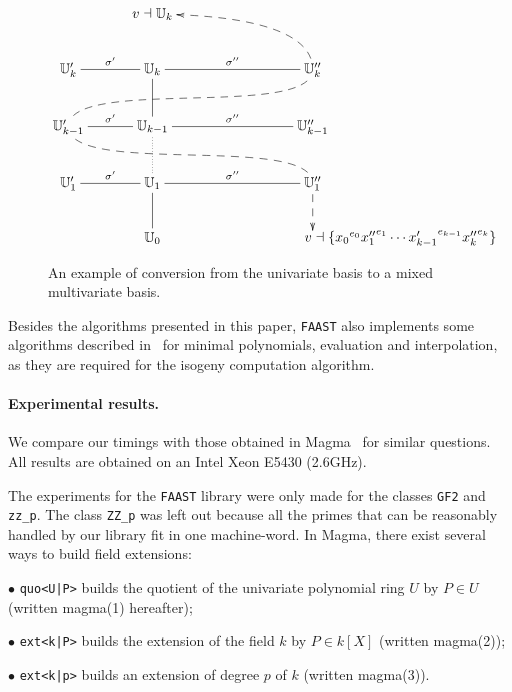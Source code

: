\begin{figure}
  \centering
  \begin{equation*}
    \xymatrix@C=1cm{
      & v\wrt\U_k \ar@{<--}@(r,u)[dr] \\
      \U_k'\ar@{-}[r]^{\sigma'} & \U_k\ar@{-}[d] & \U_k''\ar@{-}[l]_{\sigma''} \ar@{--}@(d,u)[dll]\\
      \U_{k-1}'\ar@{-}[r]^{\sigma'} \ar@{--}@(d,u)[drr] & \U_{k-1}\ar@{.}[d] & \U_{k-1}''\ar@{-}[l]_{\sigma''}\\
      \U_1'\ar@{-}[r]^{\sigma'} & \U_1\ar@{-}[d] & \U_1''\ar@{-}[l]_{\sigma''}\ar@{-->}[d]\\
      & \U_0 & *[r]{v\wrt\{{x_0}^{e_0}{x_1''}^{e_1}\cdots {x_{k-1}'}^{e_{k-1}}{x_k''}^{e_k}\}}
    }
  \end{equation*}
  \caption{An example of conversion from the univariate basis to a
    mixed multivariate basis.}
  \label{fig:lattice}
\end{figure}

Besides the algorithms presented in this paper, \texttt{FAAST} also
implements some algorithms described in~\cite{DeFeo10} for minimal
polynomials, evaluation and interpolation, as they are required for the 
isogeny computation algorithm.


\paragraph*{\bf Experimental results.} We compare our timings with
those obtained in Magma~\cite{Magma} for similar questions.  All
results are obtained on an Intel Xeon E5430 (2.6GHz).

\smallskip

The experiments for the \texttt{FAAST} library were only made for the
classes \texttt{GF2} and \texttt{zz\_p}. The class \texttt{ZZ\_p} was
left out because all the primes that can be reasonably handled by our
library fit in one machine-word. In Magma, there exist several ways to
build field extensions:

\begin{description*}
\item [$\bullet$ {\tt quo<U|P>}] builds the quotient of the
  univariate polynomial ring $U$ by  $P \in U$
  (written magma(1) hereafter);

\smallskip

\item [$\bullet$ {\tt ext<k|P>}] builds the extension of the field $k$ by $P \in
  k[X]$ (written magma(2));

\smallskip

\item [$\bullet$ {\tt ext<k|p>}] builds an extension of degree $p$ of $k$
  (written mag\-ma(3)).
\end{description*}

